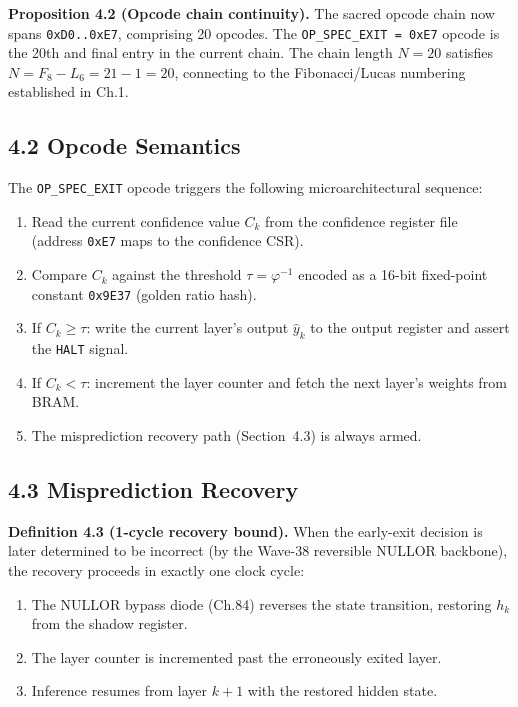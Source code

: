 \textbf{Proposition 4.2 (Opcode chain continuity).}
The sacred opcode chain now spans
\texttt{0xD0..0xE7}, comprising 20 opcodes. The
\texttt{OP\_SPEC\_EXIT = 0xE7} opcode is the 20th
and final entry in the current chain. The chain length
\(N = 20\) satisfies \(N = F_8 - L_6 = 21 - 1 = 20\),
connecting to the Fibonacci/Lucas numbering established
in Ch.1.

\subsection{4.2 Opcode Semantics}

The \texttt{OP\_SPEC\_EXIT} opcode triggers the
following microarchitectural sequence:

\begin{enumerate}
\tightlist
\item Read the current confidence value \(C_k\) from
      the confidence register file (address
      \texttt{0xE7} maps to the confidence CSR).
\item Compare \(C_k\) against the threshold
      \(\tau = \varphi^{-1}\) encoded as a 16-bit
      fixed-point constant \texttt{0x9E37} (golden
      ratio hash).
\item If \(C_k \ge \tau\): write the current layer's
      output \(\hat{y}_k\) to the output register and
      assert the \texttt{HALT} signal.
\item If \(C_k < \tau\): increment the layer counter
      and fetch the next layer's weights from BRAM.
\item The misprediction recovery path (Section~4.3)
      is always armed.
\end{enumerate}

\subsection{4.3 Misprediction Recovery}

\textbf{Definition 4.3 (1-cycle recovery bound).}
When the early-exit decision is later determined to be
incorrect (by the Wave-38 reversible NULLOR backbone),
the recovery proceeds in exactly one clock cycle:

\begin{enumerate}
\tightlist
\item The NULLOR bypass diode (Ch.84) reverses the
      state transition, restoring \(h_k\) from the
      shadow register.
\item The layer counter is incremented past the
      erroneously exited layer.
\item Inference resumes from layer \(k+1\) with the
      restored hidden state.
\end{enumerate}

